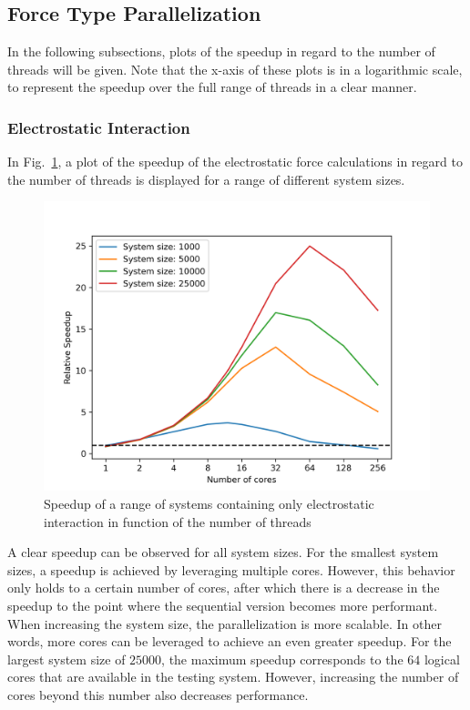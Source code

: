 \documentclass[conference]{IEEEtran}
\begin{document}
    \subsection{Force Type Parallelization}

    In the following subsections, plots of the speedup in regard to the number of threads will be given. 
    Note that the x-axis of these plots is in a logarithmic scale, to represent the speedup over the full
    range of threads in a clear manner.

        \subsubsection{Electrostatic Interaction}
        In Fig.~\ref{fig:electro-speedup}, a plot of the speedup of the electrostatic force calculations 
        in regard to the number of threads is displayed for a range of different system sizes.
        \begin{figure}[H]
            \centering
            \includegraphics[width=\linewidth]{./images/electrostatic_scaling.png} %
            \caption{Speedup of a range of systems containing only electrostatic interaction in function of the number 
            of threads}\label{fig:electro-speedup}
        \end{figure}
        A clear speedup can be observed for all system sizes. For the smallest system sizes, a speedup is achieved by leveraging
        multiple cores. However, this behavior only holds to a certain number of cores, after which there is a decrease
        in the speedup to the point where the sequential version becomes more performant. When increasing the system
        size, the parallelization is more scalable. In other words, more cores can be leveraged to achieve an even
        greater speedup. For the largest system size of $25000$, the maximum speedup corresponds to the $64$ logical
        cores that are available in the testing system. However, increasing the number of cores beyond this number
        also decreases performance.
\end{document}
